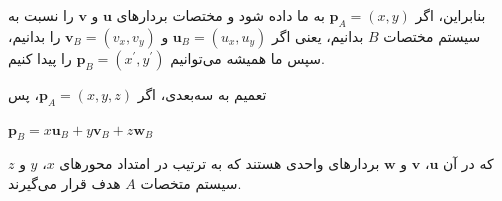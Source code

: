 {\begin{spacing}{1.5}
        بنابراین، اگر $\textbf{p}_{A}=(x, y)$ به ما داده شود و مختصات بردارهای $\textbf{u}$ و $\textbf{v}$ را نسبت به سیستم مختصات $B$ بدانیم،
        یعنی اگر $\textbf{u}_{B}=(u_{x}, u_{y})$ و $\textbf{v}_{B}=(v_{x}, v_{y})$ را بدانیم، سپس ما همیشه می‌توانیم $\textbf{p}_{B}=(x^\prime, y^\prime)$ را پیدا کنیم.

        تعمیم به سه‌بعدی، اگر $\textbf{p}_{A}=(x, y, z)$، پس

        \begin{center}
            $\textbf{p}_{B}=x\textbf{u}_{B}+y\textbf{v}_{B}+z\textbf{w}_{B}$
        \end{center}

        که در آن $\textbf{u}$، $\textbf{v}$ و $\textbf{w}$ بردارهای واحدی هستند که به ترتیب در امتداد محورهای $x$، $y$ و $z$ سیستم متخصات $A$ هدف قرار می‌گیرند.
    \end{spacing}
}

